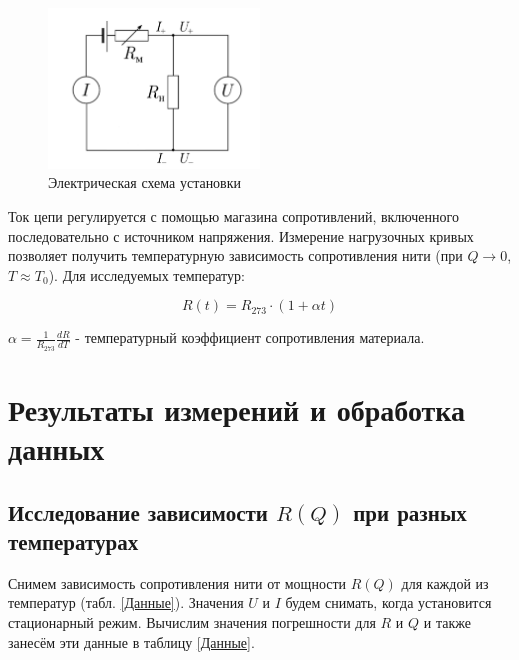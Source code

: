 \documentclass[a4paper, 12pt]{article}
\begin{document}
        \begin{figure}[H]
            \centering
            \includegraphics[width=0.5\textwidth]{images/circuit.png}
            \caption{Электрическая схема установки} 
            \label{ЭлектрическаяСхема}
        \end{figure}

        \noindent Ток цепи регулируется с помощью магазина сопротивлений, включенного последовательно с источником напряжения. Измерение нагрузочных кривых позволяет получить температурную зависимость сопротивления нити (при $Q \to 0$, $T\approx T_0$). Для исследуемых температур:
        
        \begin{equation}
            R(t)=R_{273}\cdot(1+\alpha t)
        \end{equation}
        
        \noindent $\alpha=\frac{1}{R_{273}}\frac{dR}{dT}$  - температурный коэффициент сопротивления материала.

    \section*{Результаты измерений и обработка данных}
    
        \subsection*{Исследование зависимости $R(Q)$ при разных температурах}
        
        \noindent Снимем зависимость сопротивления нити от мощности $R(Q)$ для каждой из температур (табл. \ref{Данные}). Значения $U$ и $I$ будем снимать, когда установится стационарный режим. Вычислим значения погрешности для $R$ и $Q$ и также занесём эти данные в таблицу \ref{Данные}.
\end{document}
